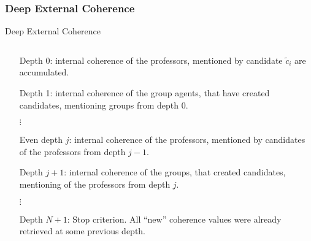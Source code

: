 \subsubsection{Deep External Coherence}

\begin{frame}{Deep External Coherence}
  \begin{columns}
    \begin{column}{.8\textwidth}
      \begin{itemize}
        \item[Depth 0:] internal coherence of the professors,
                  mentioned by candidate $\tilde{c}_i$ are accumulated.
        \item[Depth 1:] internal coherence of the group agents,
                  that have created candidates, mentioning groups from depth 0.
        \item[$\vdots$]
        \item[Even depth $j$:] internal coherence of the professors,
                  mentioned by candidates of the professors from depth $j-1$.
        \item[Depth $j+1$:] internal coherence of the groups,
                  that created candidates, mentioning of the professors from depth $j$.
        \item[$\vdots$]
        \item[Depth $N+1$:] Stop criterion.
                  All ``new'' coherence values were already retrieved at some previous depth.
      \end{itemize}
    \end{column}
  \end{columns}
\end{frame}




